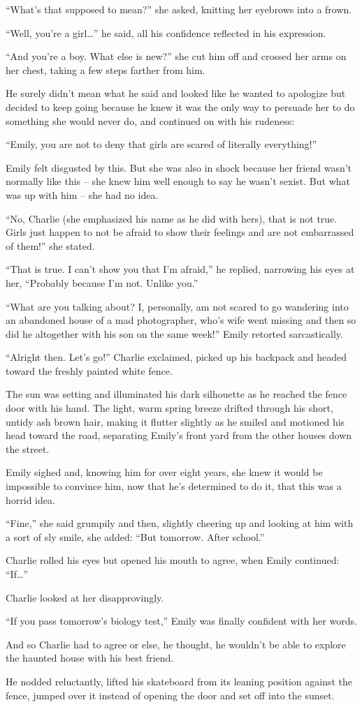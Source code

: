 “What’s that supposed to mean?” she asked, knitting her eyebrows into a frown.

“Well, you’re a girl…” he said, all his confidence reflected in his expression.

“And you’re a boy. What else is new?” she cut him off and crossed her arms on her chest, taking a few steps farther from him.

He surely didn’t mean what he said and looked like he wanted to apologize but decided to keep going because he knew it was the only way to persuade her to do something she would never do, and continued on with his rudeness:

“Emily, you are not to deny that girls are scared of literally everything!”

Emily felt disgusted by this. But she was also in shock because her friend wasn’t normally like this – she knew him well enough to say he wasn’t sexist. But what was up with him – she had no idea.

“No, Charlie (she emphasized his name as he did with hers), that is not true. Girls just happen to not be afraid to show their feelings and are not embarrassed of them!” she stated.

“That is true. I can’t show you that I’m afraid,” he replied, narrowing his eyes at her, “Probably because I’m not. Unlike you.”

“What are you talking about? I, personally, am not scared to go wandering into an abandoned house of a mad photographer, who’s wife went missing and then so did he altogether with his son on the same week!” Emily retorted sarcastically.

“Alright then. Let’s go!” Charlie exclaimed, picked up his backpack and headed toward the freshly painted white fence.

The sun was setting and illuminated his dark silhouette as he reached the fence door with his hand. The light, warm spring breeze drifted through his short, untidy ash brown hair, making it flutter slightly as he smiled and motioned his head toward the road, separating Emily’s front yard from the other houses down the street.

Emily sighed and, knowing him for over eight years, she knew it would be impossible to convince him, now that he’s determined to do it, that this was a horrid idea.

“Fine,” she said grumpily and then, slightly cheering up and looking at him with a sort of sly smile, she added: “But tomorrow. After school.”

Charlie rolled his eyes but opened his mouth to agree, when Emily continued: “If…”  

Charlie looked at her disapprovingly.

“If you pass tomorrow’s biology test,” Emily was finally confident with her words.    

And so Charlie had to agree or else, he thought, he wouldn’t be able to explore the haunted house with his best friend.
 
He nodded reluctantly, lifted his skateboard from its leaning position against the fence, jumped over it instead of opening the door and set off into the sunset.